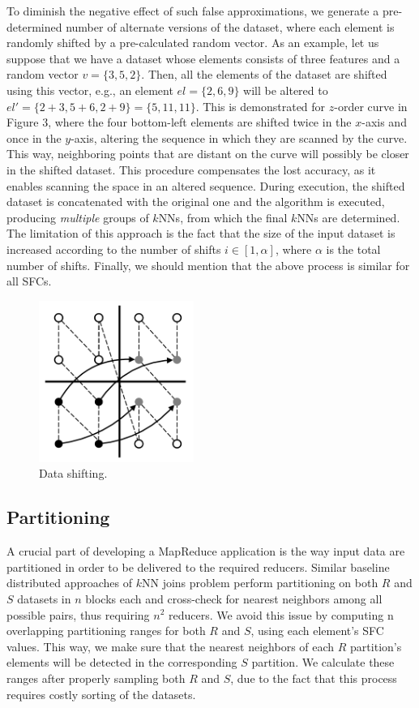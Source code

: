 To diminish the negative effect of such false approximations, we generate a pre-determined number of alternate versions of the dataset, where each element is randomly shifted by a pre-calculated random vector. As an example, let us suppose that we have a dataset whose elements consists of three features and a random vector $v=\{3, 5, 2\}$. Then, all the elements of the dataset are shifted using this vector, e.g., an element $el=\{2, 6, 9\}$ will be altered to $el'=\{2+3, 5+6, 2+9\}=\{5, 11, 11\}$. This is demonstrated for $z$-order curve in Figure 3, where the four bottom-left elements are shifted twice in the $x$-axis and once in the $y$-axis, altering the sequence in which they are scanned by the curve. This way, neighboring points that are distant on the curve will possibly be closer in the shifted dataset. This procedure compensates the lost accuracy, as it enables scanning the space in an altered sequence. During execution, the shifted dataset is concatenated with the original one and the algorithm is executed, producing \textit{multiple} groups of $k$NNs, from which the final $k$NNs are determined. The limitation of this approach is the fact that the size of the input dataset is increased according to the number of shifts $i\in{[1, \alpha]}$, where $\alpha$ is the total number of shifts. Finally, we should mention that the above process is similar for all SFCs.

\begin{figure}[!tb]
	\centering
	\includegraphics[width=0.45\textwidth]{figures/figure3.pdf}
	\caption{Data shifting.}
	\label{figure3}
\end{figure}

\subsection{Partitioning}
A crucial part of developing a MapReduce application is the way input data are partitioned in order to be delivered to the required reducers. Similar baseline distributed approaches of $k$NN joins problem perform partitioning on both $R$ and $S$ datasets in $n$ blocks each and cross-check for nearest neighbors among all possible pairs, thus requiring $n^2$ reducers. We avoid this issue by computing n overlapping partitioning ranges for both $R$ and $S$, using each element’s SFC values. This way, we make sure that the nearest neighbors of each $R$ partition’s elements will be detected in the corresponding $S$ partition. We calculate these ranges after properly sampling both $R$ and $S$, due to the fact that this process requires costly sorting of the datasets.

